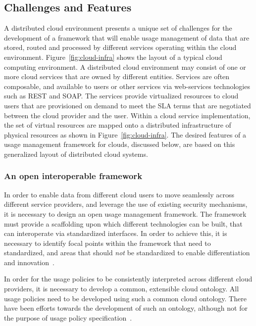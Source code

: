 \documentclass[10pt,letterpaper]{book}
\begin{document}
\subsection{Challenges and Features}
A distributed cloud environment presents a unique set of challenges for the development of a framework that will enable usage management of data that are stored, routed and processed by different services operating within the cloud environment. Figure~\ref{fig:cloud-infra} shows the layout of a typical cloud computing environment. A distributed cloud environment may consist of one or more cloud services that are owned by different entities. Services are often composable, and available to users or other services via web-services technologies such as REST and SOAP.  The services provide virtualized resources to cloud users that are provisioned on demand to meet the SLA terms that are negotiated between the cloud provider and the user. Within a cloud service implementation, the set of virtual resources are mapped onto a distributed infrastructure of physical resources as shown in Figure~\ref{fig:cloud-infra}. The desired features of a usage management framework for clouds, discussed below, are based on this generalized layout of distributed cloud systems.

\subsubsection {An open interoperable framework}
In order to enable data from different cloud users to move seamlessly across different service providers, and leverage the use of existing security mechanisms, it is necessary to design an open usage management framework. The framework must provide a scaffolding upon which different technologies can be built, that can interoperate via standardized interfaces. In order to achieve this, it is necessary to identify focal points within the framework that need to standardized, and areas that should {\em not} be standardized to enable differentiation and innovation~\cite{BlCl:01}. 

In order for the usage policies to be consistently interpreted across different cloud providers, it is necessary to develop a common, extensible cloud ontology. All usage policies need to be developed using such a common cloud ontology.  There have been efforts towards the development of such an ontology, although not for the purpose of usage policy specification~\cite{YuBuDa:08}. 
\end{document}
